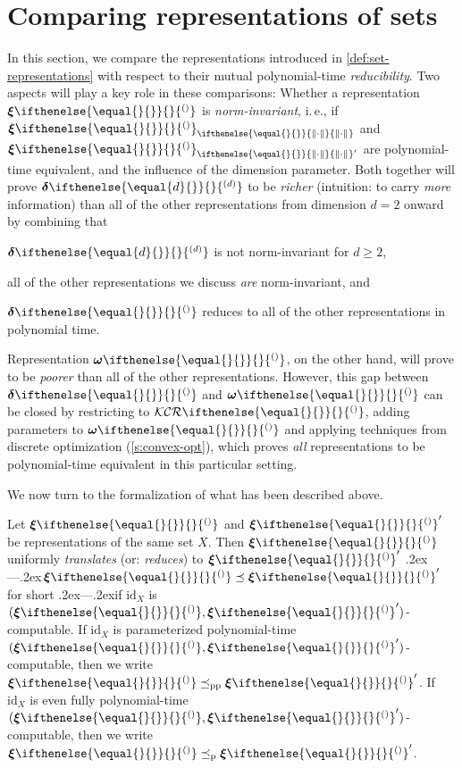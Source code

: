\documentclass{CSML}
\let\originalleft\left
\let\originalright\right
\renewcommand{\left}{\mathopen{}\mathclose\bgroup\originalleft}
\renewcommand{\right}{\aftergroup\egroup\originalright}
\newcommand{\setTypes}[2]{ \mathcal{#1}\ifnotempty{#2}{^{(#2)}} }
\newcommand{\representation}[2]{ #1\ifnotempty{#2}{^{(#2)}} }
\newcommand{\id}{\mathrm{id}}
\newcommand{\distrep}[1][\empty]{ \representation{\bm{\delta}}{#1} }
\newcommand{\wmemrep}[1][\empty]{ \representation{\bm{\omega}}{#1} }
\newcommand{\reptpl}[1][\empty]{ \representation{\bm{\xi}}{#1} }
\newcommand{\norm}[2][\empty]{
   \ifthenelse{\equal{#1}{\empty}}{%
      \left\|#2\right\|
   }{%
      \left\|#2\right\|_{#1}
   }
}
\newcommand{\normdot}[1][\empty]{\norm[#1]{\cdot}}
\newcommand{\ndot}[1][\empty]{\normdot[#1]}
\newcommand{\wrtn}[2]{#1_{#2}}
\newcommand{\ifnotempty}[2]{ \ifthenelse{ \equal{#1}{\empty} }{}{#2} }
\newcommand{\KCR}[1][\empty]{\setTypes{KCR}{#1}}
\newcommand{\pleq}{\preceq_\mathrm{p}}
\newcommand{\parampleq}{\preceq_{\mathrm{pp}}}
\newcommand{\ie}{\mbox{i.\,e.}\xspace}
\newcommand{\emdash}{\leavevmode\unskip\kern.2ex---\kern.2ex\ignorespaces}
\begin{document}


\section{Comparing representations of sets} \label{sec:comparisons}


In this section, we compare the representations introduced in
\cref{def:set-representations} with respect to their mutual polynomial-time
\emph{reducibility}.
Two aspects will play a key role in these comparisons:
Whether a representation $\reptpl$ is \emph{norm-invariant},
\ie, if $\wrtn{\reptpl}{\ndot}$ and $\wrtn{\reptpl}{\ndot'}$ are
polynomial-time equivalent,
and the influence of the dimension parameter.
Both together will prove $\distrep[d]$ to be \emph{richer} (intuition: to
carry \emph{more} information) than all of the other representations from
dimension $d=2$ onward by combining that%
\begin{enumerate*}[label=(\emph{\alph*})]
\item $\distrep[d]$ is not norm-invariant for $d \geq 2$,
\item all of the other representations we discuss \emph{are} norm-invariant,
	and
\item $\distrep$ reduces to all of the other representations in polynomial
	time.
\end{enumerate*}
Representation $\wmemrep$, on the other hand, will prove to be \emph{poorer}
than all of the other representations.
However, this gap between $\distrep$ and $\wmemrep$ can be closed by
restricting to $\KCR$, adding parameters to $\wmemrep$ and applying techniques
from discrete optimization (\cref{s:convex-opt}), which proves \emph{all}
representations to be polynomial-time equivalent in this particular setting.

We now turn to the formalization of what has been described above.

\begin{defi}
	\label{def:translations}
Let $\reptpl$ and $\reptpl'$ be representations of the same set $X$.
Then $\reptpl$ uniformly \emph{translates} (or: \emph{reduces}) to
$\reptpl'$ \emdash $\reptpl \preceq \reptpl'$ for short \emdash if
$\id_X$ is $(\reptpl,\reptpl')$-computable.
If $\id_X$ is parameterized polynomial-time $(\reptpl,\reptpl')$-computable,
then we write $\reptpl \parampleq \reptpl'$.
If $\id_X$ is even fully polynomial-time $(\reptpl,\reptpl')$-computable,
then we write $\reptpl \pleq \reptpl'$.
\end{defi}
\end{document}
